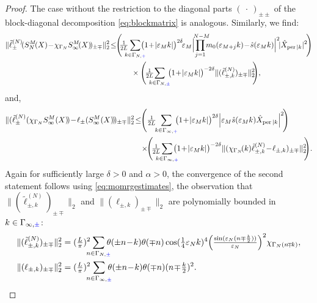 \documentclass[a4paper, 11pt]{article}
\DeclareMathOperator{\1}{\mathds{1}}
\DeclareMathOperator{\per}{per}
\begin{document}
\begin{proof}
The case without the restriction to the diagonal parts $(\!\ \cdot\!\ )_{\pm\pm}$ of the block-diagonal decomposition \eqref{eq:blockmatrix} is analogous. Similarly, we find:
\begin{align*}
\|\tilde{\ell}^{(N)}_{\pm}\!(S^{M}_{N}\!(X)\!-\!\chi_{\Gamma_{N}}S^{M}_{\infty}\!(X)\!)_{\pm\mp}\|_{2}^{2} & \!\leq\!\!\Bigg(\!\!\tfrac{1}{2L}\!\!\!\!\sum_{k\in\Gamma_{N,{\color{blue}+}}}\!\!\!\!\!\big(1\!+\!|\vep_{M}k|\big)^{2\delta}\!\vep_{M}\Big|\!\!\!\!\prod_{j=1}^{\ N-M}\!\!\!\!m_{0}(\vep_{M+j}k)\!-\!\hat{s}(\vep_{M}k)\Big|^{2}\!|\hat{X}_{\per|k}|^{2}\!\Bigg) \\
 &\hspace{1cm} \times\Bigg(\!\tfrac{1}{2L}\!\!\!\!\!\sum_{k\in\Gamma_{N,{\color{blue}\pm}}}\!\!\!\big(1\!+\!|\vep_{M}k|\big)^{-2\delta}\|(\tilde{\ell}^{(N)}_{\pm,k})_{\pm\mp}\|_{2}^{2}\!\!\Bigg),
\end{align*}
and,
\begin{align*}
\|(\tilde{\ell}^{(N)}_{\pm}(\chi_{\Gamma_{N}}S^{M}_{\infty}(X)\!)\!-\!\ell_{\pm}(S^{M}_{\infty}(X)\!)\!)_{\pm\mp}\|_{2}^{2} & \!\leq\!\!\Bigg(\tfrac{1}{2L}\!\!\sum_{k\in\Gamma_{\infty,{\color{blue}+}}}\!\!\!\big(1\!+\!|\vep_{M}k|\big)^{2\delta}\Big|\vep_{M}\hat{s}(\vep_{M}k)\hat{X}_{\per|k}\Big|^{2}\!\Bigg) \\
 &\hspace{0.25cm}\times\!\!\Bigg(\!\tfrac{1}{2L}\!\!\!\!\!\sum_{k\in\Gamma_{\infty,{\color{blue}+}}}\!\!\!\!\!\big(1\!+\!|\vep_{M}k|\big)^{-2\delta}\|(\chi_{\Gamma_{N}}\!(k)\tilde{\ell}^{(N)}_{\pm,k}\!-\!\ell_{\pm,k})_{\pm\mp}\|_{2}^{2}\!\!\Bigg).
\end{align*}
Again for sufficiently large $\delta>0$ and $\alpha>0$, the convergence of the second statement follows using \eqref{eq:momrgestimates}, the observation that $\|(\tilde{\ell}^{(N)}_{\pm,k})_{\pm\mp}\|_{2}$ and $\|(\ell_{\pm,k})_{\pm\mp}\|_{2}$ are polynomially bounded in $k\in\Gamma_{\infty,{\color{blue}\pm}}$:
\begin{align*}
\|(\tilde{\ell}^{(N)}_{\pm,k})_{\pm\mp}\|_{2}^{2} & = (\tfrac{L}{\pi})^{2}\!\!\!\!\sum_{n\in\Gamma_{N,{\color{blue}\pm}}}\!\!\!\!\theta(\pm n\!-\!k)\theta(\mp n)\cos(\tfrac{1}{4}\vep_{N}k)^{4}\Big(\tfrac{\sin(\vep_{N}(n\mp\frac{k}{2}))}{\vep_{N}}\Big)^{2}\chi_{\Gamma_{N}(n\!\mp\!k)}, \\
\|(\ell_{\pm,k})_{\pm\mp}\|_{2}^{2} & = (\tfrac{L}{\pi})^{2}\!\!\!\!\sum_{n\in\Gamma_{\infty,{\color{blue}\pm}}}\!\!\!\!\theta(\pm n\!-\!k)\theta(\mp n)(n\!\mp\!\tfrac{k}{2})^{2}.
\end{align*}
\end{proof}
\end{document}
